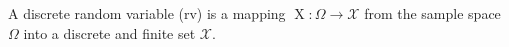 A discrete random variable (rv) is a mapping $\operatorname{X} : \Omega \to \mathcal{X}$ from the sample space $\Omega$ into a discrete and finite set $\mathcal{X}$. 
